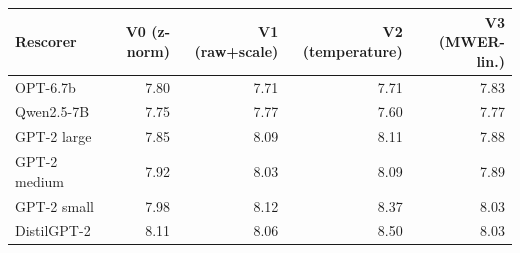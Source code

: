 \begin{tabular}{lrrrr}
\toprule
Rescorer & V0 (z-norm) & V1 (raw+scale) & V2 (temperature) & V3 (MWER-lin.) \\
\midrule
OPT-6.7b & 7.80 & 7.71 & 7.71 & 7.83 \\
Qwen2.5-7B & 7.75 & 7.77 & 7.60 & 7.77 \\
GPT-2 large & 7.85 & 8.09 & 8.11 & 7.88 \\
GPT-2 medium & 7.92 & 8.03 & 8.09 & 7.89 \\
GPT-2 small & 7.98 & 8.12 & 8.37 & 8.03 \\
DistilGPT-2 & 8.11 & 8.06 & 8.50 & 8.03 \\
\bottomrule
\end{tabular}
